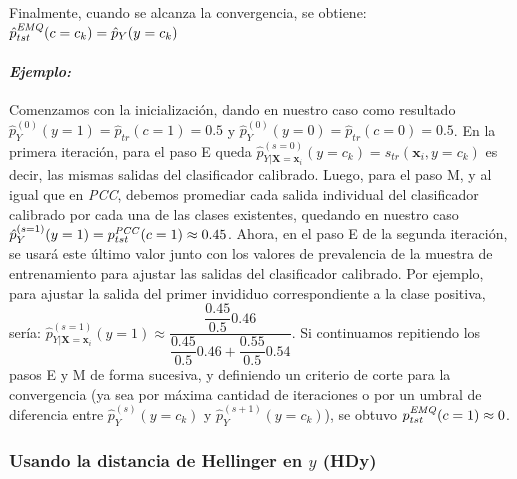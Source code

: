 Finalmente, cuando se alcanza la convergencia, se obtiene: $\hat p^{\it EMQ
\/}_{tst}(c=c_k) = \hat p_{Y}(y=c_k)$

\paragraph{\it Ejemplo:\/} Comenzamos con la inicialización, dando en nuestro
caso como resultado $\hat p^{(0)}_{Y}(y=1) = \hat p_{tr}(c=1) = 0.5$ y $\hat
p^{(0)}_{Y}(y=0) = \hat p_{tr}(c=0) = 0.5$. En la primera iteración, para el
paso E queda $\hat p^{(s=0)}_{Y|\boldsymbol{X}=\boldsymbol{x}_i}(y=c_k) =
s_{tr}(\boldsymbol{x}_i, y=c_k)$ es decir, las mismas salidas del clasificador
calibrado. Luego, para el paso M, y al igual que en {\it PCC}, debemos promediar
cada salida individual del clasificador calibrado por cada una de las clases
existentes, quedando en nuestro caso $\hat p^{(s=1)}_{Y}(y=1) = p^{\it
PCC\/}_{tst}(c=1) \approx 0.45$. Ahora, en el paso E de la segunda iteración, se
usará este último valor junto con los valores de prevalencia de la muestra de
entrenamiento para ajustar las salidas del clasificador calibrado. Por ejemplo,
para ajustar la salida del primer invididuo correspondiente a la clase positiva,
sería: $\hat p^{(s=1)}_{Y|\boldsymbol{X}=\boldsymbol{x}_i}(y=1) \approx
\dfrac{\dfrac{0.45}{0.5}0.46}{\dfrac{0.45}{0.5}0.46+\dfrac{0.55}{0.5}0.54}$. Si
continuamos repitiendo los pasos E y M de forma sucesiva, y definiendo un
criterio de corte para la convergencia (ya sea por máxima cantidad de
iteraciones o por un umbral de diferencia entre $\hat p^{(s)}_{Y}(y=c_k)$ y
$\hat p^{(s+1)}_{Y}(y=c_k)$), se obtuvo $p^{\it EMQ \/}_{tst}(c=1) \approx 0$.

\subsubsection{Usando la distancia de Hellinger en $y$ (HDy)}\label{puntual:hdy}

